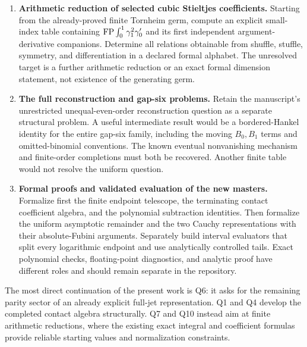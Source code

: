 \begin{enumerate}[label=\textbf{Q\arabic*.}]
\item \textbf{Arithmetic reduction of selected cubic Stieltjes coefficients.}
Starting from the already-proved finite Tornheim germ, compute an explicit
small-index table containing
\(\operatorname{FP}\int_0^1\gamma_1^2\gamma_0'\) and its first independent
argument-derivative companions. Determine all relations obtainable from
shuffle, stuffle, symmetry, and differentiation in a declared formal
alphabet. The unresolved target is a further arithmetic reduction or an
exact formal dimension statement, not existence of the generating germ.

\item \textbf{The full reconstruction and gap-six problems.}
Retain the manuscript's unrestricted unequal-even-order reconstruction
question as a separate structural problem. A useful intermediate result
would be a bordered-Hankel identity for the entire gap-six family,
including the moving \(B_0,B_1\) terms and omitted-binomial conventions.
The known eventual nonvanishing mechanism and finite-order completions
must both be recovered. Another finite table would not resolve the
uniform question.

\item \textbf{Formal proofs and validated evaluation of the new masters.}
Formalize first the finite endpoint telescope, the terminating contact
coefficient algebra, and the polynomial subtraction identities.
Then formalize the uniform asymptotic remainder and the two Cauchy
representations with their absolute-Fubini arguments. Separately build
interval evaluators that split every logarithmic endpoint and use
analytically controlled tails. Exact polynomial checks, floating-point
diagnostics, and analytic proof have different roles and should remain
separate in the repository.
\end{enumerate}

The most direct continuation of the present work is Q6: it asks for the
remaining parity sector of an already explicit full-jet representation.
Q1 and Q4 develop the completed contact algebra structurally. Q7 and Q10
instead aim at finite arithmetic reductions, where the existing exact
integral and coefficient formulas provide reliable starting values and
normalization constraints.
